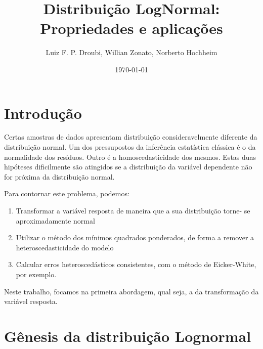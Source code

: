\documentclass[final, xcolor={table}]{beamer}
\title
[13\textsuperscript{\underline{o}} Congresso Brasileiro de Cadastro Técnico 
Multifinalitário e Gestão Territorial, 21 - 24 / OUT / 2018] %
{ %
Distribuição LogNormal:\\ 
Propriedades e aplicações
}
\author{ %
Luiz F. P. Droubi\inst{1}, Willian Zonato\inst{1}, Norberto Hochheim\inst{2}
}
\institute
[Universidade Federal de Santa Catarina] %
{
\inst{1} SPU/SC, Florianópolis/SC\\[0.3ex]
\inst{2} Universidade Federal de Santa Catarina, Florianópolis/SC\\
}
\date{\today}
\begin{document}
\begin{frame}[t]
\begin{multicols}{3}

\section{Introdução}

Certas amostras de dados apresentam distribuição consideravelmente diferente da
distribuição normal. Um dos pressupostos da inferência estatística clássica é o da
normalidade dos resíduos. Outro é a homoscedasticidade dos mesmos. Estas
duas hipóteses dificilmente são atingidos se a distribuição da variável
dependente não for próxima da distribuição normal.

Para contornar este problema, podemos:

\begin{enumerate}
  \item Transformar a variável resposta de maneira que a sua distribuição torne-
se aproximadamente normal
  \item Utilizar o método dos mínimos quadrados ponderados, de forma a remover a
heteroscedasticidade do modelo
  \item Calcular erros heteroscedásticos consistentes, com o método de Eicker-White,
por exemplo.
\end{enumerate}

Neste trabalho, focamos na primeira abordagem, qual seja, a da transformação da
variável resposta.

\section{Gênesis da distribuição Lognormal}


\end{multicols}
\end{frame}
\end{document}
